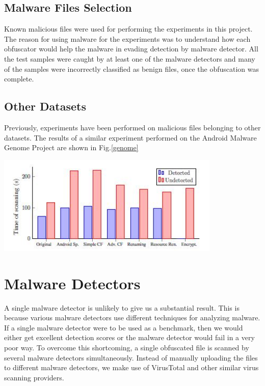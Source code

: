 	\subsection{Malware Files Selection}
		Known malicious files were used for performing the experiments in this project. The reason for using malware for the experiments was to understand how each obfuscator would help the malware in evading detection by malware detector. All the test samples were caught by at least one of the malware detectors and many of the samples were incorrectly classified as benign files, once the obfuscation was complete.

	\subsection{Other Datasets}
		Previously, experiments have been performed on malicious files belonging to other datasets. The results of a similar experiment performed on the Android
		Malware Genome Project \cite{zhou} are shown in Fig.\ref{genome}\cite{aamo}

		 \vspace{3mm}
		 \begin{center}
		 	\includegraphics[width=0.8\textwidth]{genome.jpg}
		 	\label{genome}
		\end{center}
		\vspace{3mm}
		
		
\section{Malware Detectors}
	A single malware detector is unlikely to give us a substantial result. This is because various malware detectors use different techniques for analyzing malware. If a single malware detector were to be used as a benchmark, then we would either get excellent detection scores or the malware detector would fail in a very poor way. To  overcome this shortcoming, a single obfuscated file is scanned by several malware detectors simultaneously.
	Instead of manually uploading the files to different malware detectors, we make use of VirusTotal \cite{virusTotal} and other similar virus scanning providers.